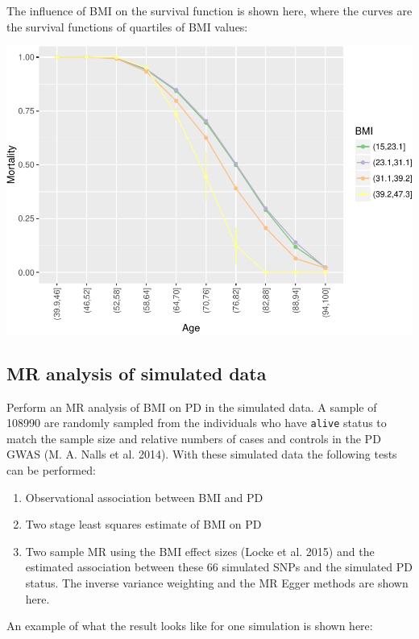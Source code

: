 \documentclass[]{article}
\begin{document}
The influence of BMI on the survival function is shown here, where the
curves are the survival functions of quartiles of BMI values:

\includegraphics{images/plot_sim_mort_age_bmi-1.pdf}

\subsection{MR analysis of simulated
data}\label{mr-analysis-of-simulated-data}

Perform an MR analysis of BMI on PD in the simulated data. A sample of
108990 are randomly sampled from the individuals who have \texttt{alive}
status to match the sample size and relative numbers of cases and
controls in the PD GWAS (M. A. Nalls et al. 2014). With these simulated
data the following tests can be performed:

\begin{enumerate}
\def\labelenumi{\arabic{enumi}.}
\itemsep1pt\parskip0pt
\item
  Observational association between BMI and PD
\item
  Two stage least squares estimate of BMI on PD
\item
  Two sample MR using the BMI effect sizes (Locke et al. 2015) and the
  estimated association between these 66 simulated SNPs and the
  simulated PD status. The inverse variance weighting and the MR Egger
  methods are shown here.
\end{enumerate}

An example of what the result looks like for one simulation is shown
here:
\end{document}
